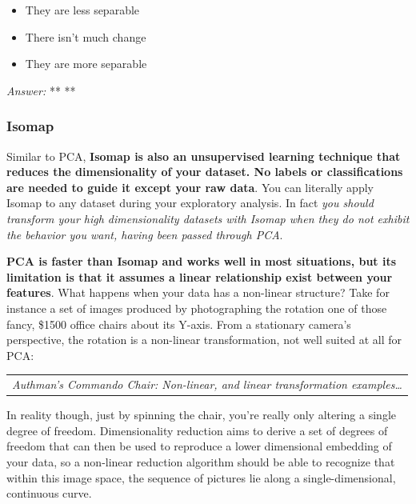 \documentclass[11pt]{article}
\providecommand{\tightlist}{%
      \setlength{\itemsep}{0pt}\setlength{\parskip}{0pt}}
\begin{document}
\begin{itemize}
\tightlist
\item
  They are less separable
\item
  There isn't much change
\item
  They are more separable
\end{itemize}

\emph{Answer:} ** **

    \hypertarget{isomap}{%
\subsubsection{Isomap}\label{isomap}}

Similar to PCA, \textbf{Isomap is also an unsupervised learning
technique that reduces the dimensionality of your dataset. No labels or
classifications are needed to guide it except your raw data}. You can
literally apply Isomap to any dataset during your exploratory analysis.
In fact \emph{you should transform your high dimensionality datasets
with Isomap when they do not exhibit the behavior you want, having been
passed through PCA}.

\textbf{PCA is faster than Isomap and works well in most situations, but
its limitation is that it assumes a linear relationship exist between
your features}. What happens when your data has a non-linear structure?
Take for instance a set of images produced by photographing the rotation
one of those fancy, \$1500 office chairs about its Y-axis. From a
stationary camera's perspective, the rotation is a non-linear
transformation, not well suited at all for PCA:

\begin{longtable}[]{@{}c@{}}
\toprule
\begin{minipage}[b]{0.97\columnwidth}\centering
\strut
\end{minipage}\tabularnewline
\midrule
\endhead
\begin{minipage}[t]{0.97\columnwidth}\centering
\emph{Authman's Commando Chair: Non-linear, and linear transformation
examples\ldots{}}\strut
\end{minipage}\tabularnewline
\bottomrule
\end{longtable}

In reality though, just by spinning the chair, you're really only
altering a single degree of freedom. Dimensionality reduction aims to
derive a set of degrees of freedom that can then be used to reproduce a
lower dimensional embedding of your data, so a non-linear reduction
algorithm should be able to recognize that within this image space, the
sequence of pictures lie along a single-dimensional, continuous curve.
\end{document}
